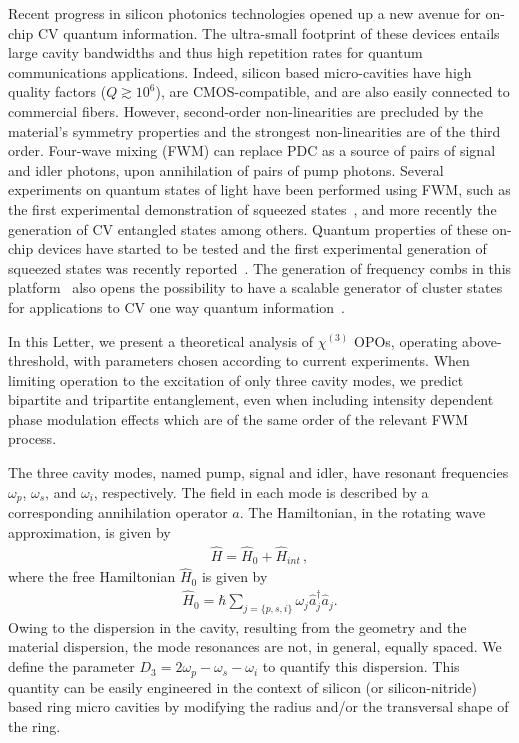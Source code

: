 \documentclass[aps,prl,twocolumn,groupedaddress]{revtex4-1}
\begin{document}
Recent progress in silicon photonics technologies opened up a new avenue for on-chip CV quantum information. The ultra-small footprint of these devices entails large cavity bandwidths and thus high repetition rates for quantum communications applications. Indeed, silicon based micro-cavities have high quality factors ($Q\gtrsim10^6$), are CMOS-compatible, and are also easily connected to commercial fibers. However, second-order non-linearities are precluded by the material's symmetry properties and the strongest non-linearities are of the third order. Four-wave mixing (FWM) can replace PDC as a source of pairs of signal and idler photons, upon annihilation of pairs of pump photons. Several experiments on quantum states of light have been performed using FWM, such as the first experimental demonstration of squeezed states~\cite{Slusher1985}, and more recently the generation of CV entangled states \cite{Boyer2008} among others. Quantum properties of these on-chip devices have started to be tested and the first experimental generation of squeezed states was recently reported~\cite{Dutt2015}. The generation of frequency combs in this platform~\cite{Levy2010} also opens the possibility to have a scalable generator of cluster states for applications to CV one way quantum information~\cite{Menicucci2006}.

In this Letter, we present a theoretical analysis of $\chi^{(3)}$ OPOs, operating above-threshold, with parameters chosen according to current experiments. When limiting operation to the excitation of only three cavity modes, we predict bipartite and tripartite entanglement, even when including intensity dependent phase modulation effects which are of the same order of the relevant FWM process.

The three cavity modes, named pump, signal and idler, have resonant frequencies $\omega_p$, $\omega_s$, and $\omega_i$, respectively. The field in each mode is described by a corresponding annihilation operator $\hat{a}$. The Hamiltonian, in the rotating wave approximation, is given by
\begin{eqnarray*}
	\hat{H}=\hat{H}_0+\hat{H}_{int} \, ,
\end{eqnarray*}
where the free Hamiltonian $\hat{H}_0$ is given by
\begin{eqnarray*}
	\hat{H}_0=\hbar\sum_{j=\{p,s,i\}}\omega_j\hat{a}_j^\dagger\hat{a}_j.
\end{eqnarray*}
Owing to the dispersion in the cavity, resulting from the geometry and the material dispersion, the mode resonances are not, in general, equally spaced. We define the parameter $D_3=2\omega_p-\omega_s-\omega_i$ to quantify this dispersion. This quantity can be easily engineered in the context of silicon (or silicon-nitride) based ring micro cavities by modifying the radius and/or the transversal shape of the ring.
\end{document}
